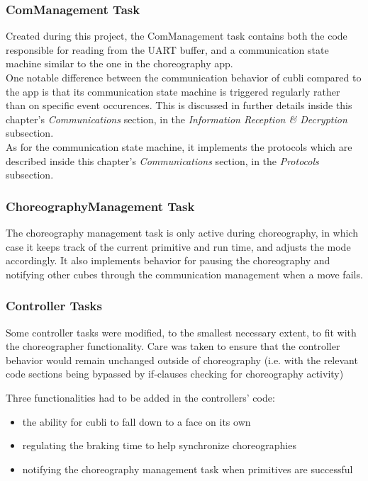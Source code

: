 \subsubsection{ComManagement Task}

Created during this project, the ComManagement task contains both the code responsible for reading from the UART buffer, and a communication state machine similar to the one in the choreography app.\\

One notable difference between the communication behavior of cubli compared to the app is that its communication state machine is triggered regularly rather than on specific event occurences. This is discussed in further details inside this chapter's \textit{Communications} section, in the \textit{Information Reception \& Decryption} subsection.\\ 

As for the communication state machine, it implements the protocols which are described inside this chapter's \textit{Communications} section, in the \textit{Protocols} subsection. 

\subsubsection{ChoreographyManagement Task}

The choreography management task is only active during choreography, in which case it keeps track of the current primitive and run time, and adjusts the mode accordingly. It also implements behavior for pausing the choreography and notifying other cubes through the communication management when a move fails.



\subsubsection{Controller Tasks}

Some controller tasks were modified, to the smallest necessary extent, to fit with the choreographer functionality. Care was taken to ensure that the controller behavior would remain unchanged outside of choreography (i.e. with the relevant code sections being bypassed by if-clauses checking for choreography activity)

Three functionalities had to be added in the controllers' code:
\begin{itemize}
\item the ability for cubli to fall down to a face on its own
\item regulating the braking time to help synchronize choreographies
\item notifying the choreography management task when primitives are successful
\end{itemize}

